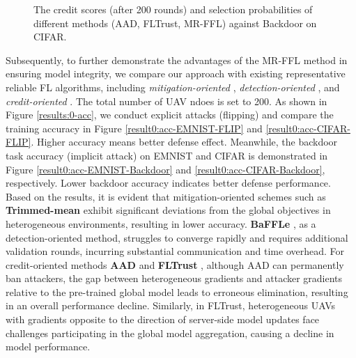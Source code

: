 \documentclass[lettersize,journal]{IEEEtran}
\begin{document}
\begin{figure}[!t]
\centering
{}
\hfil
{}
\hfil
{}
\hfil
{}
\hfil
{}
\hfil
{}
\caption{The credit scores (after 200 rounds) and selection probabilities of different methods (AAD, FLTrust, MR-FFL) against Backdoor on CIFAR.}
\label{results_Cifar_Backdoor}
\end{figure}

Subsequently, to further demonstrate the advantages of the MR-FFL method in ensuring model integrity, we compare our approach with existing representative reliable FL algorithms, including \textit{mitigation-oriented} \cite{blanchard2017machine-krum,yin2018byzantine-trimmedmean}, \textit{detection-oriented} \cite{andreina2021baffle}, and \textit{credit-oriented} \cite{li2019abnormal,cao2020fltrust}. The total number of UAV ndoes is set to 200. As shown in Figure \ref{results:0-acc}, we conduct explicit attacks (flipping) and compare the training accuracy in Figure \ref{result0:acc-EMNIST-FLIP} and \ref{result0:acc-CIFAR-FLIP}. Higher accuracy means better defense effect. Meanwhile, the backdoor task accuracy (implicit attack) on EMNIST and CIFAR is demonstrated in Figure \ref{result0:acc-EMNIST-Backdoor} and \ref{result0:acc-CIFAR-Backdoor}, respectively. Lower backdoor accuracy indicates better defense performance. 
Based on the results, it is evident that mitigation-oriented schemes such as \textbf{Trimmed-mean} \cite{yin2018byzantine-trimmedmean} exhibit significant deviations from the global objectives in heterogeneous environments, resulting in lower accuracy. \textbf{BaFFLe} \cite{andreina2021baffle}, as a detection-oriented method, struggles to converge rapidly and requires additional validation rounds, incurring substantial communication and time overhead. For credit-oriented methods \textbf{AAD} \cite{li2019abnormal} and \textbf{FLTrust} \cite{cao2020fltrust}, although AAD can permanently ban attackers, the gap between heterogeneous gradients and attacker gradients relative to the pre-trained global model leads to erroneous elimination, resulting in an overall performance decline. Similarly, in FLTrust, heterogeneous UAVs with gradients opposite to the direction of server-side model updates face challenges participating in the global model aggregation, causing a decline in model performance.
\end{document}
